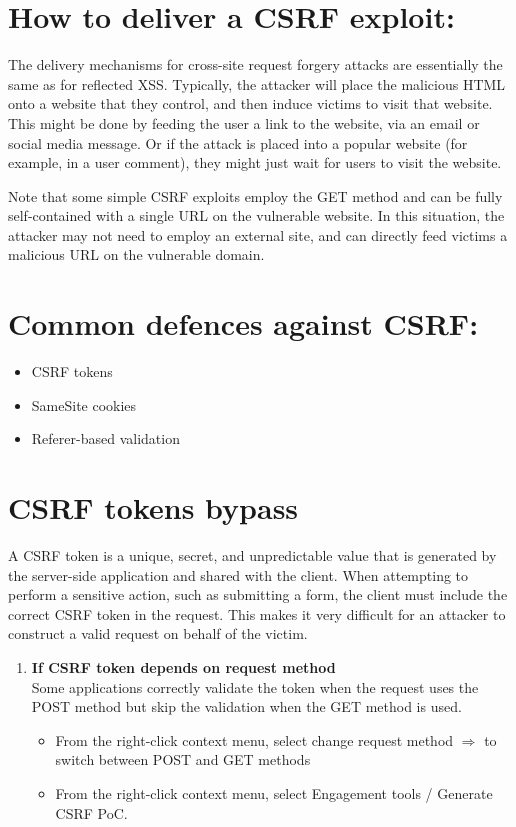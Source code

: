 \documentclass{article}
\begin{document}
\section*{How to deliver a CSRF exploit:}
 The delivery mechanisms for cross-site request forgery attacks are essentially the same as for reflected XSS. Typically, the attacker will place the malicious HTML onto a website that they control, and then induce victims to visit that website. This might be done by feeding the user a link to the website, via an email or social media message. Or if the attack is placed into a popular website (for example, in a user comment), they might just wait for users to visit the website.
 \vspace{5px}
 
Note that some simple CSRF exploits employ the GET method and can be fully self-contained with a single URL on the vulnerable website. In this situation, the attacker may not need to employ an external site, and can directly feed victims a malicious URL on the vulnerable domain.

\section*{Common defences against CSRF:}
\begin{itemize}
    \item CSRF tokens
    \item SameSite cookies
    \item Referer-based validation
\end{itemize}

\newpage

\section*{CSRF tokens bypass}
A CSRF token is a unique, secret, and unpredictable value that is generated by the server-side application and shared with the client. When attempting to perform a sensitive action, such as submitting a form, the client must include the correct CSRF token in the request. This makes it very difficult for an attacker to construct a valid request on behalf of the victim. 

\begin{enumerate}
	\item \textbf{If CSRF token depends on request method}\\
	Some applications correctly validate the token when the request uses the POST method but skip the validation when the GET method is used. 
	\begin{itemize}
    \item From the right-click context menu, select change request method $\Longrightarrow$ to switch between POST and GET methods
    \item From the right-click context menu, select Engagement tools / Generate CSRF PoC.
\end{itemize}
	
\end{enumerate}
\end{document}
